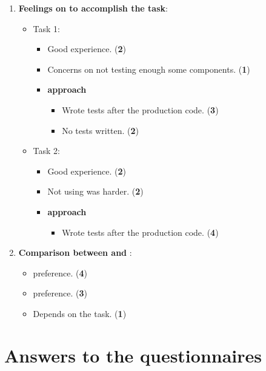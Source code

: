 \begin{enumerate}
    \ \\ \
    \item \textbf{Feelings on \notdd to accomplish the task}:
    \begin{itemize}
        \item Task 1:
        \begin{itemize}
            \item Good experience. (\textbf{2})
            \item Concerns on not testing enough some components. (\textbf{1})
            \item \textbf{\notdd approach}
            \begin{itemize}
                \item Wrote tests after the production code. (\textbf{3})
                \item No tests written. (\textbf{2})
            \end{itemize}
        \end{itemize}

        \item Task 2:
        \begin{itemize}
            \item Good experience. (\textbf{2})
            \item Not using \tdd was harder. (\textbf{2})
            \item \textbf{\notdd approach}
            \begin{itemize}
                \item Wrote tests after the production code. (\textbf{4})
            \end{itemize}
        \end{itemize}
    \end{itemize}
    
    \item \textbf{Comparison between \tdd and \notdd}:
    \begin{itemize}
        \item \tdd preference. (\textbf{4})
        \item \notdd preference. (\textbf{3})
        \item Depends on the task. (\textbf{1})
    \end{itemize}
\end{enumerate}

\section{Answers to the questionnaires}
